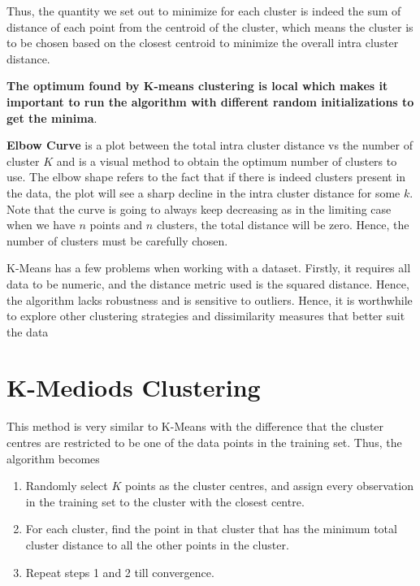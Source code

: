 \documentclass[../statistical_learning_notes.tex]{subfiles}
\begin{document}
    Thus, the quantity we set out to minimize for each cluster is indeed the sum of distance of each point from the centroid of the cluster, which means the cluster is to be chosen based on the closest centroid to minimize the overall intra cluster distance.\newline

    \textbf{The optimum found by K-means clustering is local which makes it important to run the algorithm with different random initializations to get the minima}.\newline

    \textbf{Elbow Curve} is a plot between the total intra cluster distance vs the number of cluster $K$ and is a visual method to obtain the optimum number of clusters to use. The elbow shape refers to the fact that if there is indeed clusters present in the data, the plot will see a sharp decline in the intra cluster distance for some $k$.\newline
    Note that the curve is going to always keep decreasing as in the limiting case when we have $n$ points and $n$ clusters, the total distance will be zero. Hence, the number of clusters must be carefully chosen.\newline

    K-Means has a few problems when working with a dataset. Firstly, it requires all data to be numeric, and the distance metric used is the squared distance. Hence, the algorithm lacks robustness and is sensitive to outliers. Hence, it is worthwhile to explore other clustering strategies and dissimilarity measures that better suit the data


    \section{K-Mediods Clustering}
    This method is very similar to K-Means with the difference that the cluster centres are restricted to be one of the data points in the training set. Thus, the algorithm becomes
    \begin{enumerate}
        \item Randomly select $K$ points as the cluster centres, and assign every observation in the training set to the cluster with the closest centre.
        \item For each cluster, find the point in that cluster that has the minimum total cluster distance to all the other points in the cluster.
        \item Repeat steps 1 and 2 till convergence.
    \end{enumerate}
\end{document}
